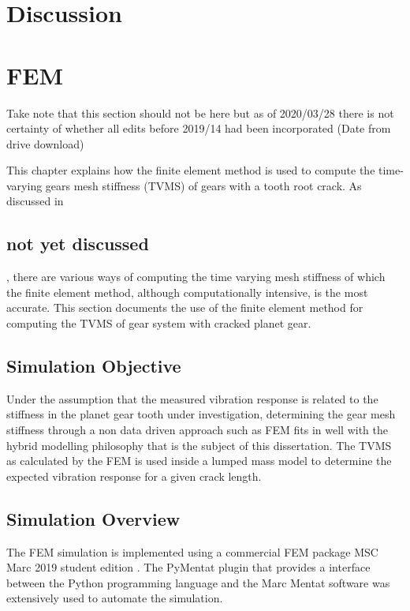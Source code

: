 
\chapter{Discussion}

\chapter{FEM}
Take note that this section should not be here but as of 2020/03/28 there is not certainty of whether all edits before 2019/14 had been incorporated (Date from drive download)

This chapter explains how the finite element method is used to compute the time-varying gears mesh stiffness (TVMS) of gears with a tooth root crack. As discussed in \section{not yet discussed}, there are various ways of computing the time varying mesh stiffness of which the finite element method, although computationally intensive, is the most accurate. This section documents the use of the finite element method for computing the TVMS of gear system with cracked planet gear.




\section{Simulation Objective}
Under the assumption that the measured vibration response is related to the stiffness in the planet gear tooth under investigation, determining the gear mesh stiffness through a non data driven approach such as FEM fits in well with the hybrid modelling philosophy that is the subject of this dissertation. The TVMS as calculated by the FEM is used inside a lumped mass model to determine the expected vibration response for a given crack length. 

\section{Simulation Overview}
The FEM simulation is implemented using a commercial FEM package MSC Marc 2019 student edition \cite{MSCMarc2019}. The PyMentat plugin \cite{Marc_Py2003} that provides a interface between the Python programming language and the Marc Mentat software was extensively used to automate the simulation. 

